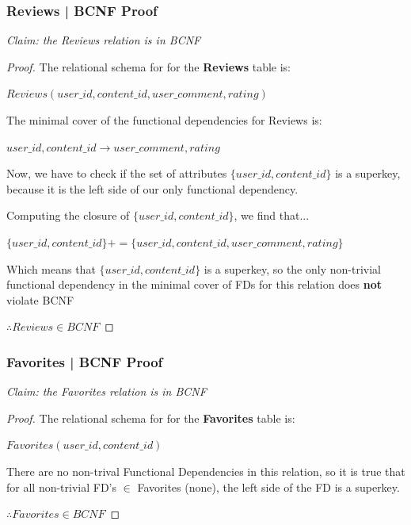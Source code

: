 \documentclass[letter, 12pt, titlepage]{article}
\begin{document}
\subsubsection{Reviews | BCNF Proof }


\textit{Claim: the Reviews relation is in BCNF}


\begin{proof}


	The relational schema for for the \textbf{Reviews} table is:


	$Reviews(user\_id, content\_id, user\_comment, rating)$


	The minimal cover of the functional dependencies for Reviews is:


	$ user\_id, content\_id \rightarrow user\_comment, rating $


	Now, we have to check if the set of attributes  $\{user\_id, content\_id\}$ is a superkey, because it is the left side of our only functional dependency.


	Computing the closure of $\{user\_id, content\_id\}$, we find that...

	$\{user\_id, content\_id\}+ = \{user\_id, content\_id, user\_comment, rating\} $

	Which means that $\{user\_id, content\_id\}$ is a superkey, so the only non-trivial functional dependency in the minimal cover of FDs for this relation does \textbf{not} violate BCNF

	$\therefore Reviews \in BCNF $
\end{proof}


\subsubsection{Favorites | BCNF Proof }



\textit{Claim: the Favorites relation is in BCNF}


\begin{proof}


	The relational schema for for the \textbf{Favorites} table is:

	$Favorites(user\_id, content\_id)$

	There are no non-trival Functional Dependencies in this relation, so it is true that for all non-trivial FD's $\in$ Favorites (none), the left side of the FD is a superkey.

	$\therefore Favorites \in BCNF $


\end{proof}
\end{document}

